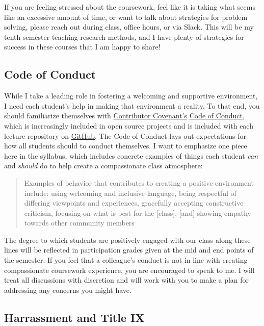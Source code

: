 \documentclass[]{book}
\theoremstyle{definition}
\theoremstyle{definition}
\theoremstyle{definition}
\theoremstyle{remark}
\begin{document}
If you are feeling stressed about the coursework, feel like it is taking
what seems like an excessive amount of time, or want to talk about
strategies for problem solving, please reach out during class, office
hours, or via Slack. This will be my tenth semester teaching research
methods, and I have plenty of strategies for success in these courses
that I am happy to share!

\hypertarget{code-of-conduct}{%
\subsection{Code of Conduct}\label{code-of-conduct}}

While I take a leading role in fostering a welcoming and supportive
environment, I need each student's help in making that environment a
reality. To that end, you should familiarize themselves with
\href{https://www.contributor-covenant.org}{Contributor Covenant's}
\href{https://www.contributor-covenant.org/version/1/4/code-of-conduct}{Code
of Conduct}, which is increasingly included in open source projects and
is included with each lecture repository on
\href{https://github.com/slu-soc5050}{GitHub}. The Code of Conduct lays
out expectations for how all students should to conduct themselves. I
want to emphasize one piece here in the syllabus, which includes
concrete examples of things each student \emph{can} and \emph{should} do
to help create a compassionate class atmosphere:

\begin{quote}
Examples of behavior that contributes to creating a positive environment
include: using welcoming and inclusive language, being respectful of
differing viewpoints and experiences, gracefully accepting constructive
criticism, focusing on what is best for the {[}class{]}, {[}and{]}
showing empathy towards other community members
\end{quote}

The degree to which students are positively engaged with our class along
these lines will be reflected in participation grades given at the mid
and end points of the semester. If you feel that a colleague's conduct
is not in line with creating compassionate coursework experience, you
are encouraged to speak to me. I will treat all discussions with
discretion and will work with you to make a plan for addressing any
concerns you might have.

\hypertarget{harrassment-and-title-ix}{%
\subsection{Harrassment and Title IX}\label{harrassment-and-title-ix}}
\end{document}
